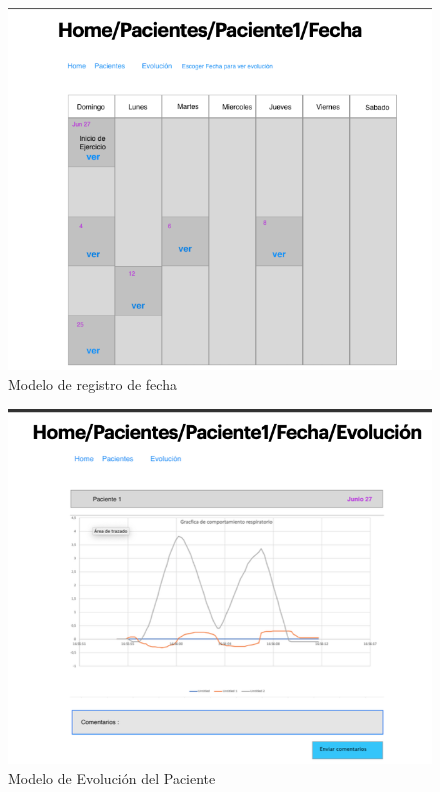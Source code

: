 \documentclass[12pt]{article}
\begin{document}
\begin{figure}[ht]
\centering
\includegraphics[scale=0.35]{imag/P8.png}
\caption{Modelo de registro de fecha }
\label{60}
\end{figure}
\FloatBarrier


\begin{figure}[ht]
\centering
\includegraphics[scale=0.4]{imag/P9.png}
\caption{Modelo de Evolución del Paciente }
\label{61}
\end{figure}
\FloatBarrier
\end{document}
